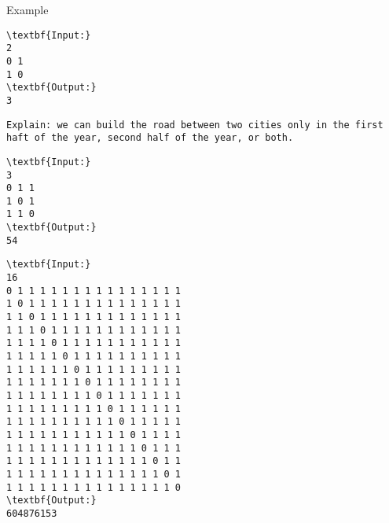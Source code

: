 Example
\begin{verbatim}
\textbf{Input:}
2
0 1
1 0
\textbf{Output:}
3\end{verbatim}
\begin{verbatim}
Explain: we can build the road between two cities only in the first haft of the year, second half of the year, or both.\end{verbatim}
\begin{verbatim}
\textbf{Input:}
3
0 1 1
1 0 1
1 1 0
\textbf{Output:}
54
\end{verbatim}
\begin{verbatim}
\textbf{Input:}
16
0 1 1 1 1 1 1 1 1 1 1 1 1 1 1 1
1 0 1 1 1 1 1 1 1 1 1 1 1 1 1 1
1 1 0 1 1 1 1 1 1 1 1 1 1 1 1 1
1 1 1 0 1 1 1 1 1 1 1 1 1 1 1 1
1 1 1 1 0 1 1 1 1 1 1 1 1 1 1 1
1 1 1 1 1 0 1 1 1 1 1 1 1 1 1 1
1 1 1 1 1 1 0 1 1 1 1 1 1 1 1 1
1 1 1 1 1 1 1 0 1 1 1 1 1 1 1 1
1 1 1 1 1 1 1 1 0 1 1 1 1 1 1 1
1 1 1 1 1 1 1 1 1 0 1 1 1 1 1 1
1 1 1 1 1 1 1 1 1 1 0 1 1 1 1 1
1 1 1 1 1 1 1 1 1 1 1 0 1 1 1 1
1 1 1 1 1 1 1 1 1 1 1 1 0 1 1 1
1 1 1 1 1 1 1 1 1 1 1 1 1 0 1 1
1 1 1 1 1 1 1 1 1 1 1 1 1 1 0 1
1 1 1 1 1 1 1 1 1 1 1 1 1 1 1 0
\textbf{Output:}
604876153\end{verbatim}